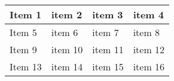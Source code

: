 \documentclass{article}
\renewcommand{\arraystretch}{1}
\begin{document}
{
\begin{tabular}{|l|l|l|l|} \hline
  Item 1 & item 2 & item 3 & item 4 \\ \hline
  Item 5 & item 6 & item 7 & item 8 \\ \hline
  Item 9 & item 10 & item 11 & item 12 \\ \hline
  Item 13 & item 14 & item 15 & item 16 \\ \hline
\end{tabular}}




\end{document}
